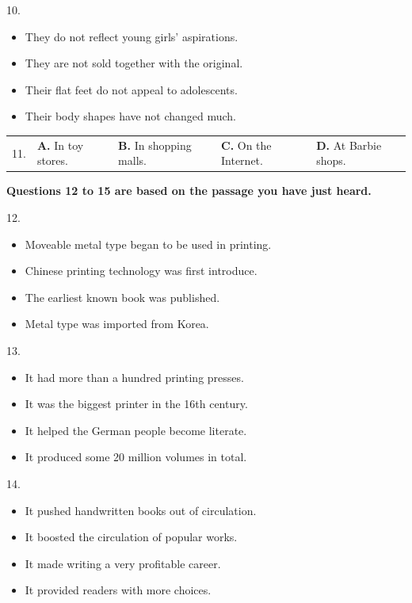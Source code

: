 \documentclass[UTF8,11pt]{ctexart}
\begin{document}
10.


\begin{itemize}[leftmargin=2em,itemsep=.2em,topsep=.4em]\item[A.] They do not reflect young girls’ aspirations.
\item[B.] They are not sold together with the original.
\item[C.] Their flat feet do not appeal to adolescents.
\item[D.] Their body shapes have not changed much.
\end{itemize}

\noindent\begin{tabularx}{\linewidth}{@{}lXXXX@{}}11. & \textbf{A.} In toy stores. & \textbf{B.} In shopping malls. & \textbf{C.} On the Internet. & \textbf{D.} At Barbie shops.\\\end{tabularx}\par

\textbf{Questions 12 to 15 are based on the passage you have just heard.}


12.


\begin{itemize}[leftmargin=2em,itemsep=.2em,topsep=.4em]\item[A.] Moveable metal type began to be used in printing.
\item[B.] Chinese printing technology was first introduce.
\item[C.] The earliest known book was published.
\item[D.] Metal type was imported from Korea.
\end{itemize}

13.


\begin{itemize}[leftmargin=2em,itemsep=.2em,topsep=.4em]\item[A.] It had more than a hundred printing presses.
\item[B.] It was the biggest printer in the 16th century.
\item[C.] It helped the German people become literate.
\item[D.] It produced some 20 million volumes in total.
\end{itemize}

14.


\begin{itemize}[leftmargin=2em,itemsep=.2em,topsep=.4em]\item[A.] It pushed handwritten books out of circulation.
\item[B.] It boosted the circulation of popular works.
\item[C.] It made writing a very profitable career.
\item[D.] It provided readers with more choices.
\end{itemize}
\end{document}

